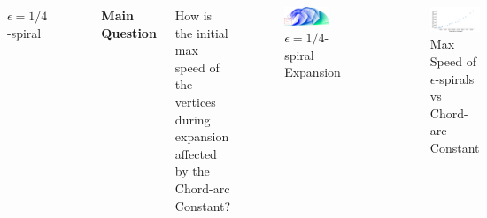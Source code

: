 \documentclass{beamer}
\begin{document}
\begin{frame}
\begin{columns}[t]
\begin{columns}
\begin{figure}
                \caption{$\epsilon = 1/4$-spiral}
                \label{fig:spiral}
            \end{figure}
        \end{columns}
        \vspace{0pt}


        {\centering \large \textbf{Main Question} \\}
        
        How is the initial max speed of the vertices during expansion affected by the Chord-arc Constant?
        \vspace{1cm}
        \renewcommand{\thefigure}{2a}
        \begin{figure}
            \centering
            \includegraphics[width=0.8\textwidth]{figures/spiral_fourth.png}
            \caption{$\epsilon = 1/4$-spiral Expansion}
            \label{fig:spiral_exp}
        \end{figure}
        \vspace{-2cm}
        \renewcommand{\thefigure}{2b}
        \begin{figure}
            \centering
            \includegraphics[width=\textwidth]{figures/scatter.png}
            \caption{Max Speed of $\epsilon$-spirals vs Chord-arc Constant}
            \label{fig:speed_v_chordarc}
        \end{figure}
        \vspace{-0.5cm}

\end{columns}
\end{frame}
\end{document}
